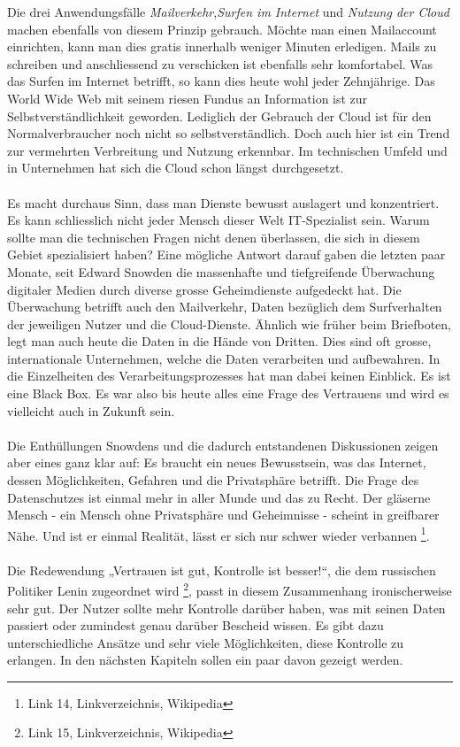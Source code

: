 Die drei Anwendungsfälle \textit{Mailverkehr},\textit{Surfen im Internet} und \textit{Nutzung der Cloud} machen ebenfalls von diesem Prinzip gebrauch. Möchte man einen Mailaccount einrichten, kann man dies gratis innerhalb weniger Minuten erledigen. Mails zu schreiben und anschliessend zu verschicken ist ebenfalls sehr komfortabel. Was das Surfen im Internet betrifft, so kann dies heute wohl jeder Zehnjährige. Das World Wide Web mit seinem riesen Fundus an Information ist zur Selbstverständlichkeit geworden. Lediglich der Gebrauch der Cloud ist für den Normalverbraucher noch nicht so selbstverständlich. Doch auch hier ist ein Trend zur vermehrten Verbreitung und Nutzung erkennbar. Im technischen Umfeld und in Unternehmen hat sich die Cloud schon längst durchgesetzt.
\\
\\
Es macht durchaus Sinn, dass man Dienste bewusst auslagert und konzentriert. Es kann schliesslich nicht jeder Mensch dieser Welt IT-Spezialist sein. Warum sollte man die technischen Fragen nicht denen überlassen, die sich in diesem Gebiet spezialisiert haben? Eine mögliche Antwort darauf gaben die letzten paar Monate, seit Edward Snowden die massenhafte und tiefgreifende Überwachung digitaler Medien durch diverse grosse Geheimdienste aufgedeckt hat. Die Überwachung betrifft auch den Mailverkehr, Daten bezüglich dem Surfverhalten der jeweiligen Nutzer und die Cloud-Dienste. Ähnlich wie früher beim Briefboten, legt man auch heute die Daten in die Hände von Dritten. Dies sind oft grosse, internationale Unternehmen, welche die Daten verarbeiten und aufbewahren. In die Einzelheiten des Verarbeitungsprozesses hat man dabei keinen Einblick. Es ist eine Black Box. Es war also bis heute alles eine Frage des Vertrauens und wird es vielleicht auch in Zukunft sein.
\\
\\
Die Enthüllungen Snowdens und die dadurch entstandenen Diskussionen zeigen aber eines ganz klar auf: Es braucht ein neues Bewusstsein, was das Internet, dessen Möglichkeiten,  Gefahren und die Privatsphäre betrifft. Die Frage des Datenschutzes ist einmal mehr in aller Munde und das zu Recht. Der gläserne Mensch - ein Mensch ohne Privatsphäre und Geheimnisse - scheint in greifbarer Nähe. Und ist er einmal Realität, lässt er sich nur schwer wieder verbannen
\footnote{Link 14, Linkverzeichnis, Wikipedia}.
\\
\\
Die Redewendung „Vertrauen ist gut, Kontrolle ist besser!“, die dem russischen Politiker Lenin zugeordnet wird
\footnote{Link 15, Linkverzeichnis, Wikipedia}, passt in diesem Zusammenhang ironischerweise sehr gut. Der Nutzer sollte mehr Kontrolle darüber haben, was mit seinen Daten passiert oder zumindest genau darüber Bescheid wissen. Es gibt dazu unterschiedliche Ansätze und sehr viele Möglichkeiten, diese Kontrolle zu erlangen. In den nächsten Kapiteln sollen ein paar davon gezeigt werden.

